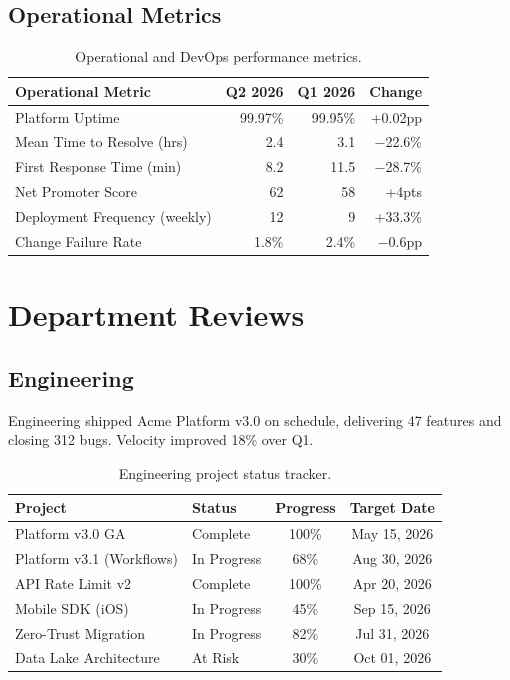 \documentclass[
    language=english,
    doctype=quarterly-report,
    institution=none,
]{../../omnilatex}
\begin{document}
\subsection{Operational Metrics}

\begin{table}[h]
    \centering
    \begin{tabular}{lrrr}
        \toprule
        \textbf{Operational Metric} & \textbf{Q2 2026} & \textbf{Q1 2026} & \textbf{Change} \\
        \midrule
        Platform Uptime               & 99.97\%  & 99.95\%  & +0.02pp \\
        Mean Time to Resolve (hrs)    & 2.4      & 3.1      & $-$22.6\% \\
        First Response Time (min)     & 8.2      & 11.5     & $-$28.7\% \\
        Net Promoter Score            & 62       & 58       & +4pts \\
        Deployment Frequency (weekly) & 12       & 9        & +33.3\% \\
        Change Failure Rate           & 1.8\%    & 2.4\%    & $-$0.6pp \\
        \bottomrule
    \end{tabular}
    \caption{Operational and DevOps performance metrics.}
\end{table}

\section{Department Reviews}

\subsection{Engineering}

Engineering shipped Acme Platform v3.0 on schedule, delivering 47 features
and closing 312 bugs. Velocity improved 18\% over Q1.

\begin{table}[h]
    \centering
    \begin{tabular}{llcc}
        \toprule
        \textbf{Project} & \textbf{Status} & \textbf{Progress} & \textbf{Target Date} \\
        \midrule
        Platform v3.0 GA          & \cellcolor{green!20}Complete  & 100\% & May 15, 2026 \\
        Platform v3.1 (Workflows) & \cellcolor{yellow!20}In Progress & 68\%  & Aug 30, 2026 \\
        API Rate Limit v2         & \cellcolor{green!20}Complete  & 100\% & Apr 20, 2026 \\
        Mobile SDK (iOS)          & \cellcolor{yellow!20}In Progress & 45\%  & Sep 15, 2026 \\
        Zero-Trust Migration      & \cellcolor{yellow!20}In Progress & 82\%  & Jul 31, 2026 \\
        Data Lake Architecture    & \cellcolor{red!15}At Risk    & 30\%  & Oct 01, 2026 \\
        \bottomrule
    \end{tabular}
    \caption{Engineering project status tracker.}
\end{table}
\end{document}
